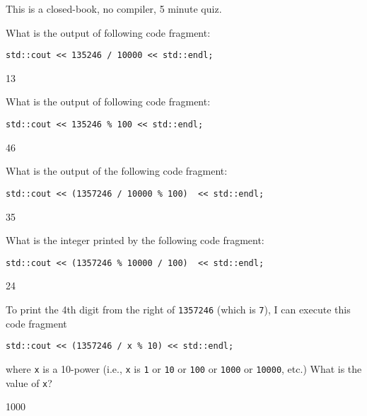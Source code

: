 

This is a closed-book, no compiler, 5 minute quiz.

\nextq
What is the output of following code fragment:
\begin{Verbatim}[frame=single,fontsize=\footnotesize]
std::cout << 135246 / 10000 << std::endl;
\end{Verbatim}
\ANSWER
\begin{answercode}
13
\end{answercode}

\nextq
What is the output of following code fragment:
\begin{Verbatim}[frame=single,fontsize=\footnotesize]
std::cout << 135246 % 100 << std::endl;
\end{Verbatim}
\ANSWER
\begin{answercode}
46
\end{answercode}

\nextq
What is the output of the following code fragment:
\begin{Verbatim}[frame=single,fontsize=\footnotesize]
std::cout << (1357246 / 10000 % 100)  << std::endl;
\end{Verbatim}
\ANSWER
\begin{answercode}
35
\end{answercode}

\nextq
What is the integer printed by the following code fragment:
\begin{Verbatim}[frame=single,fontsize=\footnotesize]
std::cout << (1357246 % 10000 / 100)  << std::endl;
\end{Verbatim}
\ANSWER
\begin{answercode}
24
\end{answercode}

\nextq
To print the 4th digit from the right of \verb!1357246! (which is \verb!7!),
I can execute this code fragment
\begin{Verbatim}[frame=single,fontsize=\footnotesize]
std::cout << (1357246 / x % 10) << std::endl;
\end{Verbatim}
where \verb!x! is a 10-power
(i.e., \verb!x! is \verb!1! or \verb!10! or \verb!100! or \verb!1000!
or \verb!10000!, etc.)
What is the value of \verb!x!?
\\
\ANSWER
\begin{answercode}
1000
\end{answercode}

